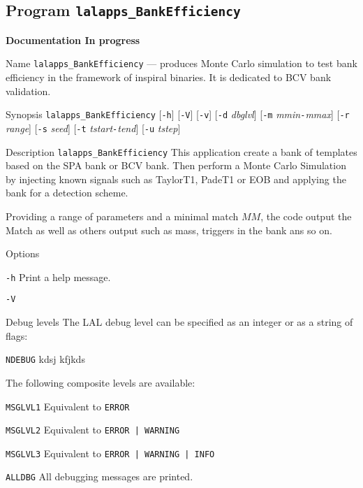 \subsection{Program \texttt{lalapps\_BankEfficiency}}
\label{program:lalapps-BankEfficiency}
{\LARGE{{\bf Documentation In progress}}}

\begin{entry}

\item[Name]
\verb$lalapps_BankEfficiency$ --- produces Monte Carlo simulation to test bank efficiency
in the framework of inspiral binaries. It is dedicated to BCV bank validation.

\item[Synopsis]
\verb$lalapps_BankEfficiency$ [\verb$-h$] [\verb$-V$] [\verb$-v$]
[\verb$-d$ \textit{dbglvl}]
[\verb$-m$ \textit{mmin}\texttt{-}\textit{mmax}]
[\verb$-r$ \textit{range}]
[\verb$-s$ \textit{seed}]
[\verb$-t$ \textit{tstart}\texttt{-}\textit{tend}]
[\verb$-u$ \textit{tstep}]

\item[Description]
\verb$lalapps_BankEfficiency$ This application create a bank of templates based on the
SPA bank or BCV bank. Then perform a Monte Carlo Simulation by injecting known signals
such as TaylorT1, PadeT1 or EOB and applying the bank for a detection scheme.
 
Providing a range of parameters and a minimal match $MM$, the code output the Match as well
as others output such as mass, triggers in the bank ans so on. 



\item[Options]\leavevmode
\begin{entry}
\item[\texttt{-h}]
Print a help message.
\item[\texttt{-V}]
\end{entry}

\item[Debug levels]
The LAL debug level can be specified as an integer or as a string of flags:
\begin{entry}
\item[\texttt{NDEBUG}]
kdsj kfjkds
\end{entry}


The following composite levels are available:
\begin{entry}
\item[\texttt{MSGLVL1}]
Equivalent to \verb$ERROR$
\item[\texttt{MSGLVL2}]
Equivalent to \verb$ERROR | WARNING$
\item[\texttt{MSGLVL3}]
Equivalent to \verb$ERROR | WARNING | INFO$
\item[\texttt{ALLDBG}]
All debugging messages are printed.
\end{entry}



\end{entry}
